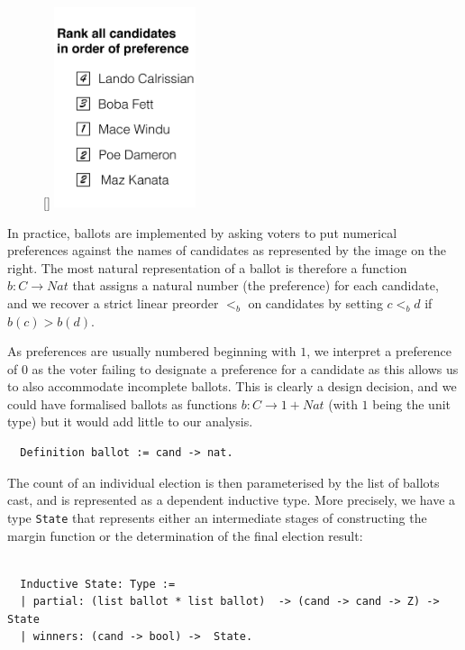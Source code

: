\begin{figure}
  \begin{center}
    \raisebox{0pt}[\dimexpr{}\baselineskip\relax]
    {\includegraphics[width=0.37\textwidth]{bal-cropped.pdf}}
    \vspace*{-8ex}
  \end{center}
\end{figure}
In practice, ballots are
implemented by asking voters to put numerical preferences against
the names of candidates as represented by the image on the right.
The most natural representation of a ballot is therefore a function
$b: C \to Nat$ that assigns a natural number (the preference) for
each candidate, and we recover a strict linear preorder $<_b$ on candidates
by setting $c <_b d$ if $b(c) > b(d)$. 

As preferences are usually
numbered beginning with $1$, we interpret a preference of $0$ as the
voter failing to designate a preference for a candidate
as this allows us to also accommodate incomplete ballots.
This is clearly a design decision, and we could have formalised
ballots as functions $b: C \to 1 + Nat$ (with $1$ being the unit
type) but it would add little to our analysis.
%
%
\begin{verbatim}
  Definition ballot := cand -> nat.
\end{verbatim}

\noindent
The count of an individual election is then parameterised by the list
of ballots cast, and is represented as a dependent inductive type.
More precisely, we have a type \texttt{State} that represents either
an
intermediate stages of constructing the margin function or the
determination of the final election result:
\begin{verbatim}

  Inductive State: Type :=
  | partial: (list ballot * list ballot)  -> (cand -> cand -> Z) -> State
  | winners: (cand -> bool) ->  State.

\end{verbatim}

